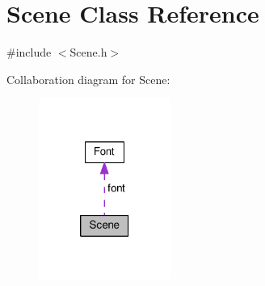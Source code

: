 \hypertarget{class_scene}{\section{Scene Class Reference}
\label{class_scene}
}


{\ttfamily \#include $<$Scene.\+h$>$}



Collaboration diagram for Scene\+:\nopagebreak
\begin{figure}[H]
\begin{center}
\leavevmode
\includegraphics[width=122pt]{class_scene__coll__graph}
\end{center}
\end{figure}
